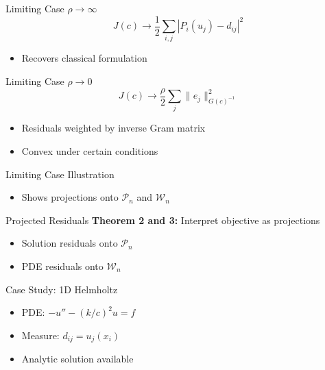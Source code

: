 \documentclass{beamer}
\begin{document}
\begin{frame}{Limiting Case $\rho \to \infty$}
\begin{equation*}
J(c) \to \frac{1}{2} \sum_{i,j} |P_i(u_j) - d_{ij}|^2
\end{equation*}
\begin{itemize}
  \item Recovers classical formulation
\end{itemize}
\end{frame}

\begin{frame}{Limiting Case $\rho \to 0$}
\begin{equation*}
J(c) \to \frac{\rho}{2} \sum_j \|e_j\|_{G(c)^{-1}}^2
\end{equation*}
\begin{itemize}
  \item Residuals weighted by inverse Gram matrix
  \item Convex under certain conditions
\end{itemize}
\end{frame}

\begin{frame}{Limiting Case Illustration}
\begin{itemize}
  \item Shows projections onto $\mathcal{P}_n$ and $\mathcal{W}_n$
\end{itemize}
\end{frame}

\begin{frame}{Projected Residuals}
\textbf{Theorem 2 and 3:} Interpret objective as projections
\begin{itemize}
  \item Solution residuals onto $\mathcal{P}_n$
  \item PDE residuals onto $\mathcal{W}_n$
\end{itemize}
\end{frame}

\begin{frame}{Case Study: 1D Helmholtz}
\begin{itemize}
  \item PDE: $-u'' - (k/c)^2 u = f$
  \item Measure: $d_{ij} = u_j(x_i)$
  \item Analytic solution available
\end{itemize}
\end{frame}
\end{document}
